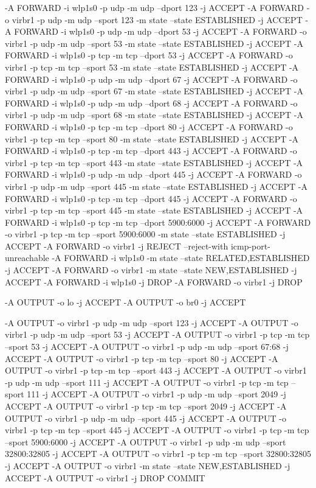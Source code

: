 \documentclass[mingoth,a4paper]{jsarticle}
\begin{document}
{{{{{{{{{{{{{{{{{\begin{commandline}
-A FORWARD -i wlp1s0 -p udp -m udp --dport 123 -j ACCEPT
-A FORWARD -o virbr1 -p udp -m udp --sport 123 -m state --state ESTABLISHED -j ACCEPT
-A FORWARD -i wlp1s0 -p udp -m udp --dport 53 -j ACCEPT
-A FORWARD -o virbr1 -p udp -m udp --sport 53 -m state --state ESTABLISHED -j ACCEPT
-A FORWARD -i wlp1s0 -p tcp -m tcp --dport 53 -j ACCEPT
-A FORWARD -o virbr1 -p tcp -m tcp --sport 53 -m state --state ESTABLISHED -j ACCEPT
-A FORWARD -i wlp1s0 -p udp -m udp --dport 67 -j ACCEPT
-A FORWARD -o virbr1 -p udp -m udp --sport 67 -m state --state ESTABLISHED -j ACCEPT
-A FORWARD -i wlp1s0 -p udp -m udp --dport 68 -j ACCEPT
-A FORWARD -o virbr1 -p udp -m udp --sport 68 -m state --state ESTABLISHED -j ACCEPT
-A FORWARD -i wlp1s0 -p tcp -m tcp --dport 80 -j ACCEPT
-A FORWARD -o virbr1 -p tcp -m tcp --sport 80 -m state --state ESTABLISHED -j ACCEPT
-A FORWARD -i wlp1s0 -p tcp -m tcp --dport 443 -j ACCEPT
-A FORWARD -o virbr1 -p tcp -m tcp --sport 443 -m state --state ESTABLISHED -j ACCEPT
-A FORWARD -i wlp1s0 -p udp -m udp --dport 445 -j ACCEPT
-A FORWARD -o virbr1 -p udp -m udp --sport 445 -m state --state ESTABLISHED -j ACCEPT
-A FORWARD -i wlp1s0 -p tcp -m tcp --dport 445 -j ACCEPT
-A FORWARD -o virbr1 -p tcp -m tcp --sport 445 -m state --state ESTABLISHED -j ACCEPT
-A FORWARD -i wlp1s0 -p tcp -m tcp --dport 5900:6000 -j ACCEPT
-A FORWARD -o virbr1 -p tcp -m tcp --sport 5900:6000 -m state --state ESTABLISHED -j ACCEPT
-A FORWARD -o virbr1 -j REJECT --reject-with icmp-port-unreachable
-A FORWARD -i wlp1s0 -m state --state RELATED,ESTABLISHED -j ACCEPT
-A FORWARD -o virbr1 -m state --state NEW,ESTABLISHED -j ACCEPT
-A FORWARD -i wlp1s0 -j DROP
-A FORWARD -o virbr1 -j DROP

-A OUTPUT -o lo -j ACCEPT
-A OUTPUT -o br0 -j ACCEPT

-A OUTPUT -o virbr1 -p udp -m udp --sport 123 -j ACCEPT
-A OUTPUT -o virbr1 -p udp -m udp --sport 53 -j ACCEPT
-A OUTPUT -o virbr1 -p tcp -m tcp --sport 53 -j ACCEPT
-A OUTPUT -o virbr1 -p udp -m udp --sport 67:68 -j ACCEPT
-A OUTPUT -o virbr1 -p tcp -m tcp --sport 80 -j ACCEPT
-A OUTPUT -o virbr1 -p tcp -m tcp --sport 443 -j ACCEPT
-A OUTPUT -o virbr1 -p udp -m udp --sport 111 -j ACCEPT
-A OUTPUT -o virbr1 -p tcp -m tcp --sport 111 -j ACCEPT
-A OUTPUT -o virbr1 -p udp -m udp --sport 2049 -j ACCEPT
-A OUTPUT -o virbr1 -p tcp -m tcp --sport 2049 -j ACCEPT
-A OUTPUT -o virbr1 -p udp -m udp --sport 445 -j ACCEPT
-A OUTPUT -o virbr1 -p tcp -m tcp --sport 445 -j ACCEPT
-A OUTPUT -o virbr1 -p tcp -m tcp --sport 5900:6000 -j ACCEPT
-A OUTPUT -o virbr1 -p udp -m udp --sport 32800:32805 -j ACCEPT
-A OUTPUT -o virbr1 -p tcp -m tcp --sport 32800:32805 -j ACCEPT
-A OUTPUT -o virbr1 -m state --state NEW,ESTABLISHED -j ACCEPT
-A OUTPUT -o virbr1 -j DROP
COMMIT


\end{commandline}}}}}}}}}}}}}}}}}}
\end{document}
